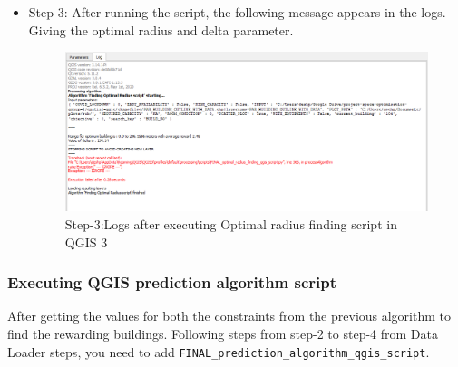 \begin{itemize}
\item Step-3: After running the script, the following message appears in the logs. Giving the optimal radius and delta parameter.

\begin{figure}[H]
\centering
\includegraphics[width=12cm,keepaspectratio=true]{resources/opt3.PNG}
\caption{Step-3:Logs after executing Optimal radius finding script in QGIS 3}
\label{fig:opt3}
\end{figure}
\end{itemize}

\subsubsection{Executing QGIS prediction algorithm script}
After getting the values for both the constraints from the previous algorithm to find the rewarding buildings. Following steps from step-2 to step-4 from Data Loader steps, you need to add \texttt{FINAL\_prediction\_algorithm\_qgis\_script}.

